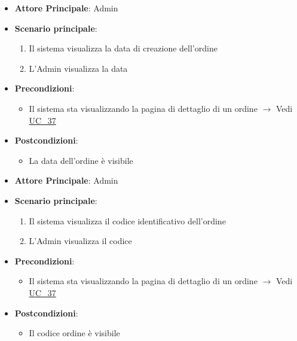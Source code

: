 \label{uc_37.3}

\begin{itemize}
    \item \textbf{Attore Principale}: Admin
	\item \textbf{Scenario principale}:
	\begin{enumerate}
		\item Il sistema visualizza la data di creazione dell'ordine
		\item L'Admin visualizza la data
	\end{enumerate}
	\item \textbf{Precondizioni}:
	\begin{itemize}
		\item Il sistema sta visualizzando la pagina di dettaglio di un ordine $\rightarrow$ Vedi \hyperref[uc_37]{UC\_37}
	\end{itemize}
	\item \textbf{Postcondizioni}:
	\begin{itemize}
		\item La data dell'ordine è visibile
	\end{itemize}
\end{itemize}

\label{uc_37.4}

\begin{itemize}
    \item \textbf{Attore Principale}: Admin
	\item \textbf{Scenario principale}:
	\begin{enumerate}
		\item Il sistema visualizza il codice identificativo dell'ordine
		\item L'Admin visualizza il codice
	\end{enumerate}
	\item \textbf{Precondizioni}:
	\begin{itemize}
		\item Il sistema sta visualizzando la pagina di dettaglio di un ordine $\rightarrow$ Vedi \hyperref[uc_37]{UC\_37}
	\end{itemize}
	\item \textbf{Postcondizioni}:
	\begin{itemize}
		\item Il codice ordine è visibile
	\end{itemize}
\end{itemize}

